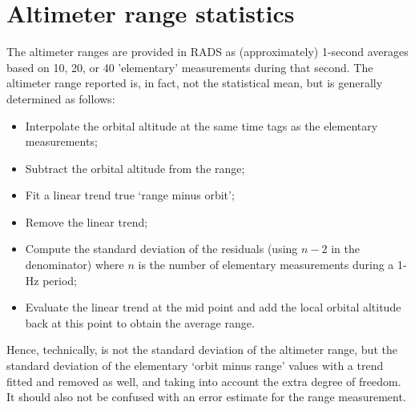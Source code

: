 \documentclass[a4paper,11pt,openany,natbib,nomargin]{thesis}
\begin{document}
\section{Altimeter range statistics}
The altimeter ranges are provided in RADS as (approximately) 1-second averages based on 10, 20, or 40 'elementary' measurements during that second. The altimeter range reported is, in fact, not the statistical mean, but is generally determined as follows:
\begin{itemize}
\item Interpolate the orbital altitude at the same time tags as the elementary measurements;
\item Subtract the orbital altitude from the range;
\item Fit a linear trend true `range minus orbit';
\item Remove the linear trend;
\item Compute the standard deviation of the residuals (using $n-2$ in the denominator) where $n$ is the number of elementary measurements during a 1-Hz period;
\item Evaluate the linear trend at the mid point and add the local orbital altitude back at this point to obtain the average range.
\end{itemize}
Hence, technically,  is not the standard deviation of the altimeter range, but the standard deviation of the elementary `orbit minus range' values with a trend fitted and removed as well, and taking into account the extra degree of freedom. It should also not be confused with an error estimate for the range measurement.
\end{document}
